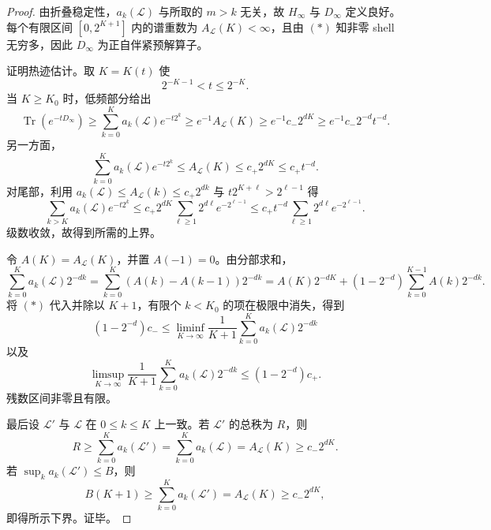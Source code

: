 \begin{proof}
由折叠稳定性，\(a_k(\mathcal L)\) 与所取的 \(m>k\) 无关，故 \(H_\infty\) 与 \(D_\infty\) 定义良好。每个有限区间 \([0,2^{K+1}]\) 内的谱重数为 \(A_{\mathcal L}(K)<\infty\)，且由 \((*)\) 知非零 shell 无穷多，因此 \(D_\infty\) 为正自伴紧预解算子。

证明热迹估计。取 \(K=K(t)\) 使
\[
2^{-K-1}<t\le 2^{-K}.
\]
当 \(K\ge K_0\) 时，低频部分给出
\[
\operatorname{Tr}(e^{-tD_\infty})
\ge \sum_{k=0}^{K}a_k(\mathcal L)e^{-t2^k}
\ge e^{-1}A_{\mathcal L}(K)
\ge e^{-1}c_-2^{dK}
\ge e^{-1}c_-2^{-d}t^{-d}.
\]
另一方面，
\[
\sum_{k=0}^{K}a_k(\mathcal L)e^{-t2^k}\le A_{\mathcal L}(K)\le c_+2^{dK}\le c_+t^{-d}.
\]
对尾部，利用 \(a_k(\mathcal L)\le A_{\mathcal L}(k)\le c_+2^{dk}\) 与 \(t2^{K+\ell}>2^{\ell-1}\) 得
\[
\sum_{k>K}a_k(\mathcal L)e^{-t2^k}
\le c_+2^{dK}\sum_{\ell\ge 1}2^{d\ell}e^{-2^{\ell-1}}
\le c_+t^{-d}\sum_{\ell\ge 1}2^{d\ell}e^{-2^{\ell-1}}.
\]
级数收敛，故得到所需的上界。

令 \(A(K)=A_{\mathcal L}(K)\)，并置 \(A(-1)=0\)。由分部求和，
\[
\sum_{k=0}^{K}a_k(\mathcal L)2^{-dk}
=\sum_{k=0}^{K}(A(k)-A(k-1))2^{-dk}
=A(K)2^{-dK}+(1-2^{-d})\sum_{k=0}^{K-1}A(k)2^{-dk}.
\]
将 \((*)\) 代入并除以 \(K+1\)，有限个 \(k<K_0\) 的项在极限中消失，得到
\[
(1-2^{-d})c_-
\le \liminf_{K\to\infty}\frac{1}{K+1}\sum_{k=0}^{K}a_k(\mathcal L)2^{-dk}
\]
以及
\[
\limsup_{K\to\infty}\frac{1}{K+1}\sum_{k=0}^{K}a_k(\mathcal L)2^{-dk}
\le (1-2^{-d})c_+.
\]
残数区间非零且有限。

最后设 \(\mathcal L'\) 与 \(\mathcal L\) 在 \(0\le k\le K\) 上一致。若 \(\mathcal L'\) 的总秩为 \(R\)，则
\[
R\ge \sum_{k=0}^{K}a_k(\mathcal L')=\sum_{k=0}^{K}a_k(\mathcal L)=A_{\mathcal L}(K)\ge c_-2^{dK}.
\]
若 \(\sup_k a_k(\mathcal L')\le B\)，则
\[
B(K+1)\ge \sum_{k=0}^{K}a_k(\mathcal L')=A_{\mathcal L}(K)\ge c_-2^{dK},
\]
即得所示下界。证毕。
\end{proof}

